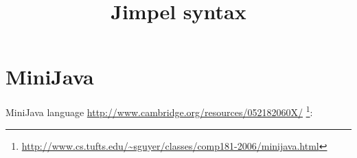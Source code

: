 \documentclass{report}
\begin{document}
\title{Jimpel syntax}

\maketitle

\section{MiniJava}
MiniJava language
\url{http://www.cambridge.org/resources/052182060X/}
\footnote{\url{http://www.cs.tufts.edu/~sguyer/classes/comp181-2006/minijava.html}}:




\end{document}
